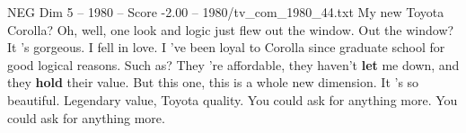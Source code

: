 \begin{textsample}{NEG Dim 5 – 1980 – Score -2.00 – 1980/tv\_com\_1980\_44.txt}  \label{ex:f5_neg_082}
My new Toyota Corolla?
Oh, well, one look and logic just flew out the window.
Out the window?
It 's gorgeous.
I fell in love.
I 've been loyal to Corolla since graduate school for good logical reasons.
Such as?
They 're affordable, they haven't \textbf{let} me down, and they \textbf{hold} their value.
But this one, this is a whole new dimension.
It 's so beautiful.
Legendary value, Toyota quality.
You could ask for anything more.
You could ask for anything more.

\end{textsample}
